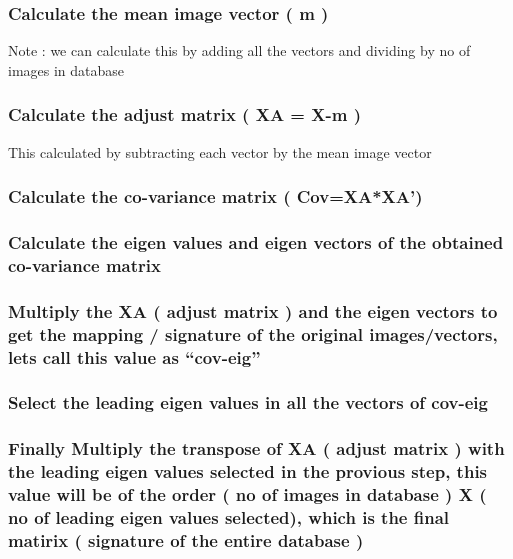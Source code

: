 \documentclass[10pt,a4paper]{article}
\begin{document}
\subsubsection{Calculate the mean image vector  ( m )  } 

 Note : we can calculate this by adding all the vectors and dividing by  no of images in database

\subsubsection{Calculate the adjust matrix  ( XA = X-m ) }

    This calculated by subtracting each vector by the mean image vector

\subsubsection{ Calculate the co-variance matrix ( Cov=XA*XA’) }

\subsubsection{ Calculate the eigen values and eigen vectors of the obtained co-variance matrix }

\subsubsection{ Multiply the XA ( adjust matrix ) and the eigen vectors to get the mapping / signature of the original images/vectors, lets call this value as “cov-eig” }

\subsubsection{ Select the leading eigen values in all the vectors of cov-eig }

\subsubsection{ Finally Multiply the transpose of XA ( adjust matrix ) with the leading eigen values selected in the provious step, this value will be of the order ( no of images in database ) X ( no of leading eigen values selected), which is the final matirix ( signature of the entire database ) }
\end{document}
